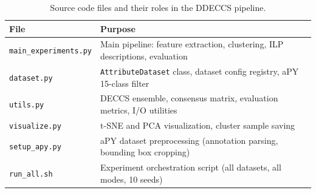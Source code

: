 \begin{table}[H]
\centering
\caption{Source code files and their roles in the DDECCS pipeline.}
\label{tab:code_files}
\begin{tabular}{lp{10cm}}
\toprule
\textbf{File} & \textbf{Purpose} \\
\midrule
\texttt{main\_experiments.py} & Main pipeline: feature extraction, clustering, ILP descriptions, evaluation \\
\texttt{dataset.py} & \texttt{AttributeDataset} class, dataset config registry, aPY 15-class filter \\
\texttt{utils.py} & DECCS ensemble, consensus matrix, evaluation metrics, I/O utilities \\
\texttt{visualize.py} & t-SNE and PCA visualization, cluster sample saving \\
\texttt{setup\_apy.py} & aPY dataset preprocessing (annotation parsing, bounding box cropping) \\
\texttt{run\_all.sh} & Experiment orchestration script (all datasets, all modes, 10 seeds) \\
\bottomrule
\end{tabular}
\end{table}
